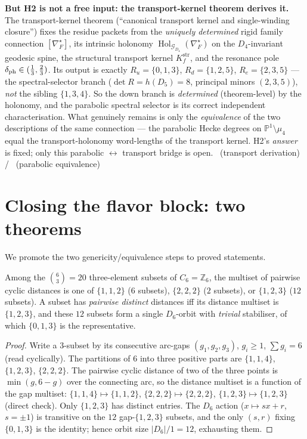 \smallskip
\noindent\textbf{But H2 is not a free input: the transport-kernel theorem derives it.} The transport-kernel theorem
(``canonical transport kernel and single-winding closure'') fixes the residue packets from the
\emph{uniquely determined} rigid family connection $[\nabla_F^\star]$, its intrinsic holonomy
$\operatorname{Hol}_{\mathcal G_{D_4}}(\nabla_F^\star)$ on the $D_4$-invariant geodesic spine, the
structural transport kernel $K_f^{\mathrm{str}}$, and the resonance pole $\delta_{\mathrm{ph}}\in(\tfrac13,\tfrac23)$.
Its output is exactly $R_u=\{0,1,3\}$, $R_d=\{1,2,5\}$, $R_e=\{2,3,5\}$ --- the spectral-selector branch
($\det R=h(D_5)=8$, principal minors $(2,3,5)$), \emph{not} the sibling $\{1,3,4\}$. So the down branch
is \emph{determined} (theorem-level) by the holonomy, and the parabolic spectral selector is its correct
independent characterisation. What genuinely remains is only the \emph{equivalence} of the two
descriptions of the same connection --- the parabolic Hecke degrees on $\mathbb P^1\setminus\mu_4$ equal
the transport-holonomy word-lengths of the transport kernel. H2's \emph{answer} is fixed; only this parabolic
$\leftrightarrow$ transport bridge is open. \mE\ (transport derivation) / \mC\ (parabolic equivalence)
\par\smallskip

\section{Closing the flavor block: two theorems}
We promote the two genericity/equivalence steps to proved statements.

\begin{lemma}
\label{lem:dd}
Among the $\binom63=20$ three-element subsets of $C_6=\mathbb Z_6$, the multiset of pairwise cyclic
distances is one of $\{1,1,2\}$ ($6$ subsets), $\{2,2,2\}$ ($2$ subsets), or $\{1,2,3\}$ ($12$ subsets).
A subset has \emph{pairwise distinct} distances iff its distance multiset is $\{1,2,3\}$, and these $12$
subsets form a single $D_6$-orbit with \emph{trivial} stabiliser, of which $\{0,1,3\}$ is the
representative.
\end{lemma}
\begin{proof}
Write a $3$-subset by its consecutive arc-gaps $(g_1,g_2,g_3)$, $g_i\ge1$, $\sum g_i=6$ (read cyclically).
The partitions of $6$ into three positive parts are $\{1,1,4\}$, $\{1,2,3\}$, $\{2,2,2\}$. The pairwise
cyclic distance of two of the three points is $\min(g,6-g)$ over the connecting arc, so the distance
multiset is a function of the gap multiset: $\{1,1,4\}\!\mapsto\!\{1,1,2\}$, $\{2,2,2\}\!\mapsto\!\{2,2,2\}$,
$\{1,2,3\}\!\mapsto\!\{1,2,3\}$ (direct check). Only $\{1,2,3\}$ has distinct entries. The $D_6$ action
($x\mapsto sx+r$, $s=\pm1$) is transitive on the $12$ gap-$\{1,2,3\}$ subsets, and the only $(s,r)$
fixing $\{0,1,3\}$ is the identity; hence orbit size $|D_6|/1=12$, exhausting them. \qedhere
\end{proof}

